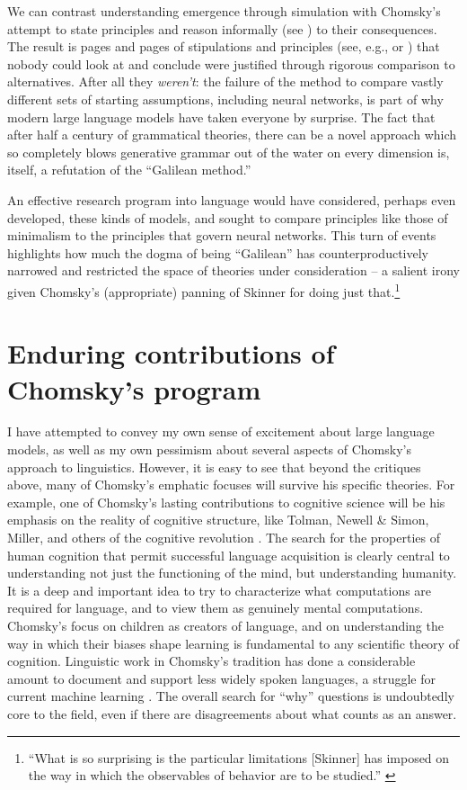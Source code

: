 \documentclass[output=paper,colorlinks,citecolor=brown
]{langscibook}
\begin{document}
We can contrast understanding emergence through simulation with Chomsky's attempt to state principles and reason informally (see \citealt{pullum1989formal}) to their consequences. The result is pages and pages of stipulations and principles (see, e.g., \citealt{collins2016formalization} or \citealt{chomsky1995minimalist}) that nobody could look at and conclude were justified through rigorous comparison to alternatives. After all they \textit{weren't}: the failure of the method to compare vastly different sets of starting assumptions, including neural networks, is part of why modern large language models have taken everyone by surprise. The fact that after half a century of grammatical theories, there can be a novel approach which so completely blows generative grammar out of the water on every dimension is, itself, a refutation of the ``Galilean method.''

An effective research program into language would have considered, perhaps even developed, these kinds of models, and sought to compare principles like those of minimalism to the principles that govern neural networks. This turn of events highlights how much the dogma of being ``Galilean'' has counterproductively narrowed and restricted the space of theories under consideration -- a salient irony given Chomsky's (appropriate) panning of Skinner for doing just that.\footnote{ ``What is so surprising is the particular limitations [Skinner] has imposed on the way in which the observables of behavior are to be studied.'' \citep{chomsky1959chomsky}} 

%

\section{Enduring contributions of Chomsky's program}

I have attempted to convey my own sense of excitement about large language models, as well as my own pessimism about several aspects of Chomsky's approach to linguistics. However, it is easy to see that beyond the critiques above, many of Chomsky's emphatic focuses will survive his specific theories. For example, one of Chomsky's lasting contributions to cognitive science will be his emphasis on the reality of cognitive structure, like Tolman, Newell \& Simon, Miller, and others of the cognitive revolution \citep{nadel2003cognitive,margaret2008mind}. The search for the properties of human cognition that permit successful language acquisition is clearly central to understanding not just the functioning of the mind, but understanding humanity. It is a deep and important idea to try to characterize what computations are required for language, and to view them as genuinely mental computations. Chomsky's focus on children as creators of language, and on understanding the way in which their biases shape learning is fundamental to any scientific theory of cognition. Linguistic work in Chomsky's tradition has done a considerable amount to document and support less widely spoken languages, a struggle for current machine learning \citep{blasi2021systematic}. The overall search for ``why'' questions is undoubtedly core to the field, even if there are disagreements about what counts as an answer.
\end{document}
